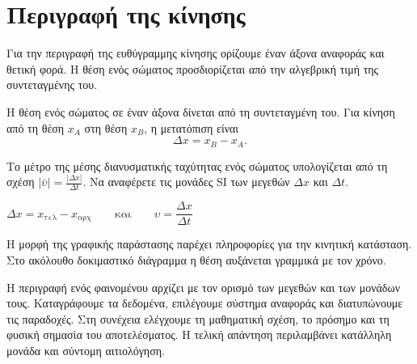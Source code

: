 \setcounter{chapter}{1}
\setcounter{section}{0}
\setcounter{equation}{0}
\setcounter{figure}{0}
\setcounter{workedexample}{0}
\setcounter{page}{1}

\section{Περιγραφή της κίνησης}

Για την περιγραφή της ευθύγραμμης κίνησης ορίζουμε έναν άξονα αναφοράς και θετική φορά. Η θέση ενός σώματος προσδιορίζεται από την αλγεβρική τιμή της συντεταγμένης του.

Η θέση ενός σώματος σε έναν άξονα δίνεται από τη συντεταγμένη του.
Για κίνηση από τη θέση $x_A$ στη θέση $x_B$, η μετατόπιση είναι
\begin{equation}\label{eq:starter-displacement}
  \Delta x=x_B-x_A.
\end{equation}


Το μέτρο της μέσης διανυσματικής ταχύτητας ενός σώματος
υπολογίζεται από τη σχέση $|\bar{\upsilon}|=\frac{|\Delta x|}{\Delta t}$.
Να αναφέρετε τις μονάδες SI των μεγεθών $\Delta x$ και $\Delta t$.

\begin{KeyFormula}
\(\Delta x=x_{\mathrm{τελ}}-x_{\mathrm{αρχ}}\qquad\text{και}\qquad \upsilon=\dfrac{\Delta x}{\Delta t}\)
\end{KeyFormula}


Η μορφή της γραφικής παράστασης παρέχει πληροφορίες για την κινητική κατάσταση. Στο ακόλουθο δοκιμαστικό διάγραμμα η θέση αυξάνεται γραμμικά με τον χρόνο.

Η περιγραφή ενός φαινομένου αρχίζει με τον ορισμό των μεγεθών και των μονάδων
τους. Καταγράφουμε τα δεδομένα, επιλέγουμε σύστημα αναφοράς και διατυπώνουμε
τις παραδοχές. Στη συνέχεια ελέγχουμε τη μαθηματική σχέση, το πρόσημο και τη
φυσική σημασία του αποτελέσματος. Η τελική απάντηση περιλαμβάνει κατάλληλη
μονάδα και σύντομη αιτιολόγηση.\par

